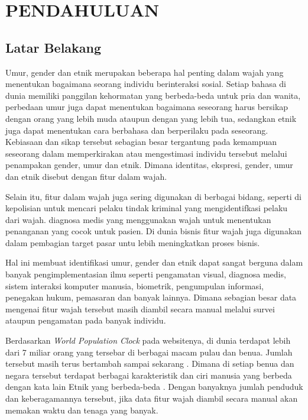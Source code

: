 \section{PENDAHULUAN}

\subsection{Latar Belakang}

Umur, gender dan etnik merupakan beberapa hal penting dalam wajah yang menentukan bagaimana seorang 
individu berinteraksi sosial. Setiap bahasa di dunia memiliki panggilan kehormatan yang berbeda-beda 
untuk pria dan wanita, perbedaan umur juga dapat menentukan bagaimana seseorang harus bersikap dengan 
orang yang lebih muda ataupun dengan yang lebih tua, sedangkan etnik juga dapat menentukan cara berbahasa 
dan berperilaku pada seseorang. Kebiasaan dan sikap tersebut sebagian besar tergantung pada kemampuan 
seseorang dalam memperkirakan atau mengestimasi individu tersebut melalui penampakan gender, umur dan 
etnik. Dimana identitas, ekspresi, gender, umur dan etnik disebut dengan fitur dalam wajah. \par
Selain itu, fitur dalam wajah juga sering digunakan di berbagai bidang, seperti di kepolisian untuk 
mencari pelaku tindak kriminal yang mengidentifkasi pelaku dari wajah. diagnosa medis yang menggunakan 
wajah untuk menentukan penanganan yang cocok untuk pasien. Di dunia bisnis fitur wajah juga digunakan 
dalam pembagian target pasar untu lebih meningkatkan proses bisnis. \par
Hal ini membuat identifikasi umur, gender dan etnik dapat sangat berguna dalam banyak pengimplementasian 
ilmu seperti pengamatan visual, diagnosa medis, sistem interaksi komputer manusia, biometrik, pengumpulan 
informasi, penegakan hukum, pemasaran dan banyak lainnya. Dimana sebagian besar data mengenai fitur wajah 
tersebut masih diambil secara manual melalui survei ataupun pengamatan pada banyak individu. \par
Berdasarkan \textit{World Population Clock} pada websitenya, di dunia terdapat lebih dari 7 miliar orang yang 
tersebar di berbagai macam pulau dan benua. Jumlah tersebut masih terus bertambah sampai sekarang \citep{Worldometer}.
Dimana di setiap benua dan negara tersebut terdapat berbagai karakteristik dan ciri manusia yang berbeda 
dengan kata lain Etnik yang berbeda-beda \citep{Infoplease}. Dengan banyaknya jumlah penduduk dan keberagamannya tersebut, 
jika data fitur wajah diambil secara manual akan memakan waktu dan tenaga yang banyak.


